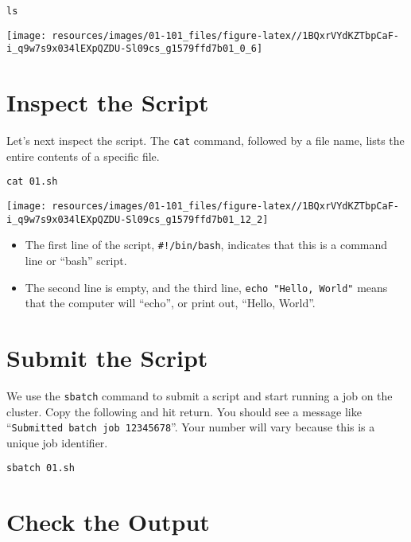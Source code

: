 \documentclass[
]{book}
\providecommand{\tightlist}{%
  \setlength{\itemsep}{0pt}\setlength{\parskip}{0pt}}
\begin{document}
\begin{verbatim}
ls
\end{verbatim}

\texttt{[image: resources/images/01-101\_files/figure-latex//1BQxrVYdKZTbpCaF-i\_q9w7s9x034lEXpQZDU-Sl09cs\_g1579ffd7b01\_0\_6]}

\hypertarget{inspect-the-script}{%
\section{Inspect the Script}\label{inspect-the-script}}

Let's next inspect the script. The \texttt{cat} command, followed by a file name, lists the entire contents of a specific file.

\begin{verbatim}
cat 01.sh
\end{verbatim}

\texttt{[image: resources/images/01-101\_files/figure-latex//1BQxrVYdKZTbpCaF-i\_q9w7s9x034lEXpQZDU-Sl09cs\_g1579ffd7b01\_12\_2]}

\begin{itemize}
\tightlist
\item
  The first line of the script, \texttt{\#!/bin/bash}, indicates that this is a command line or ``bash'' script.
\item
  The second line is empty, and the third line, \texttt{echo\ "Hello,\ World"} means that the computer will ``echo'', or print out, ``Hello, World''.
\end{itemize}

\hypertarget{submit-the-script}{%
\section{Submit the Script}\label{submit-the-script}}

We use the \texttt{sbatch} command to submit a script and start running a job on the cluster. Copy the following and hit return. You should see a message like ``\texttt{Submitted\ batch\ job\ 12345678}''. Your number will vary because this is a unique job identifier.

\begin{verbatim}
sbatch 01.sh
\end{verbatim}

\hypertarget{check-the-output}{%
\section{Check the Output}\label{check-the-output}}
\end{document}
